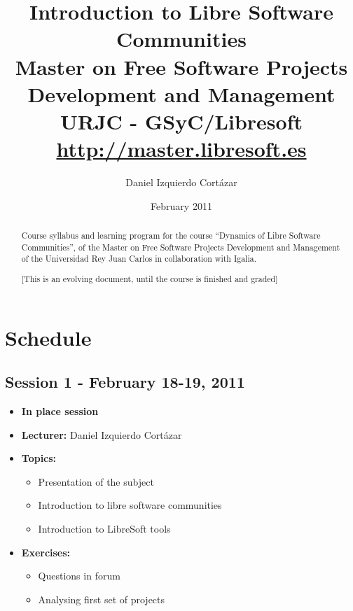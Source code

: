\documentclass[a4paper]{article}
\title{Introduction to Libre Software Communities\\
Master on Free Software Projects Development and Management \\
URJC - GSyC/Libresoft \\
\url{http://master.libresoft.es}}
\author{Daniel Izquierdo Cortázar}
\date{February 2011}
\begin{document}
\maketitle

\begin{abstract}
Course syllabus and learning program for the course ``Dynamics of Libre Software Communities'', of the Master on Free Software Projects Development and Management of the Universidad Rey Juan Carlos in collaboration with Igalia.

[This is an evolving document, until the course is finished and graded]
\end{abstract}

\tableofcontents

\section{Schedule}



\subsection{Session 1 - February 18-19, 2011}

\begin{itemize}
\item \textbf{In place session}
\item \textbf{Lecturer:} Daniel Izquierdo Cortázar
\item \textbf{Topics:}
  \begin {itemize}
    \item Presentation of the subject
    \item Introduction to libre software communities
    \item Introduction to LibreSoft tools
  \end{itemize}
\item \textbf{Exercises:}
  \begin{itemize}
    \item Questions in forum 
    \item Analysing first set of projects
  \end{itemize}
\end{itemize}
\end{document}
